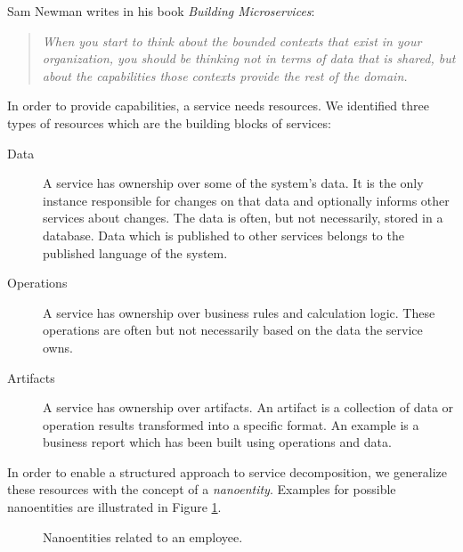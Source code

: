 Sam Newman writes in his book \textit{Building Microservices}\cite[p. 34]{newman2015building}: 

\begin{quote}
	\textit{When you start to think about the bounded contexts that exist in your organization, you should be thinking not in terms of data that is shared, but about the capabilities those contexts provide the rest of the domain.}
\end{quote}


In order to provide capabilities, a service needs resources. We identified three types of resources which are the building blocks of services:

\begin{description}
	\item[Data] A service has ownership over some of the system's data. It is the only instance responsible for changes on that data and optionally informs other services about changes. The data is often, but not necessarily, stored in a database. Data which is published to other services belongs to the published language of the system.
	\item[Operations] A service has ownership over business rules and calculation logic. These operations are often but not necessarily based on the data the service owns.
	\item[Artifacts] A service has ownership over artifacts. An artifact is a collection of data or operation results transformed into a specific format. An example is a business report which has been built using operations and data.
\end{description}

In order to enable a structured approach to service decomposition, we generalize these resources with the concept of a \textit{nanoentity}. Examples for possible nanoentities are illustrated in Figure \ref{fig:nanoentities}.

\begin{figure}[H]
	\caption{Nanoentities related to an employee.}
	\label{fig:nanoentities}
\end{figure}	

